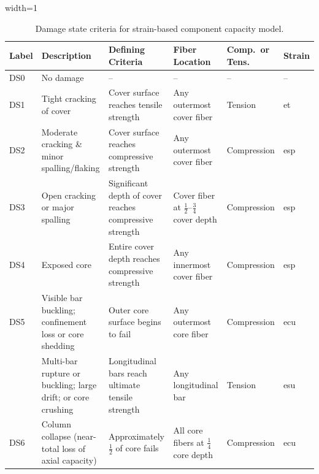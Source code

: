 \begin{table}[H]
\centering
\caption{Damage state criteria for strain-based component capacity model.}
\begin{adjustbox}{width=1\textwidth}
\renewcommand{\arraystretch}{1.5}
\begin{tabular}{>{\centering\arraybackslash}m{1.2cm}
                 m{4.2cm}
                 m{5.2cm}
                 m{3.4cm}
                 >{\centering\arraybackslash}m{2.4cm}
                 >{\centering\arraybackslash}m{1.4cm}}

\toprule
\textbf{Label} &
\textbf{Description} &
\textbf{Defining Criteria} &
\textbf{Fiber Location} &
\textbf{Comp.\ or Tens.} &
\textbf{Strain} \\
\midrule

DS0 & No damage & -- & -- & -- & -- \\
\rowcolor{lightgray}
DS1 & Tight cracking of cover &
  Cover surface reaches tensile strength &
  Any outermost cover fiber & Tension & \gls{et} \\

DS2 & Moderate cracking \& minor spalling/flaking &
  Cover surface reaches compressive strength &
  Any outermost cover fiber & Compression & \gls{esp} \\
\rowcolor{lightgray}
DS3 & Open cracking or major spalling &
  Significant depth of cover reaches compressive strength &
  Cover fiber at $\tfrac{1}{2}$--$\tfrac{3}{4}$ cover depth & Compression & \gls{esp} \\

DS4 & Exposed core &
  Entire cover depth reaches compressive strength &
  Any innermost cover fiber & Compression & \gls{esp} \\
\rowcolor{lightgray}
DS5 & Visible bar buckling; confinement loss or core shedding &
  Outer core surface begins to fail &
  Any outermost core fiber & Compression & \gls{ecu} \\
\rowcolor{lightgray}
      & Multi-bar rupture or buckling; large drift; or core crushing &
  Longitudinal bars reach ultimate tensile strength &
  Any longitudinal bar & Tension & \gls{esu} \\

DS6 & Column collapse (near-total loss of axial capacity) &
  Approximately $\tfrac{1}{2}$ of core fails &
  All core fibers at $\tfrac{1}{4}$ core depth & Compression & \gls{ecu} \\

\bottomrule
\end{tabular}
\end{adjustbox}
\label{tab:DS2}
\end{table}

